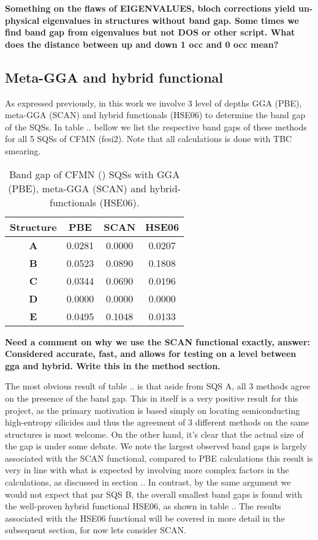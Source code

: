 \textbf{Something on the flaws of EIGENVALUES, bloch corrections yield un-physical eigenvalues in structures without band gap. Some times we find band gap from eigenvalues but not DOS or other script. What does the distance between up and down 1 occ and 0 occ mean?} 

\subsection{Meta-GGA and hybrid functional}

As expressed previously, in this work we involve 3 level of depths GGA (PBE), meta-GGA (SCAN) and hybrid functionals (HSE06) to determine the band gap of the SQSs. In table .. bellow we list the respective band gaps of these methods for all 5 SQSs of CFMN (fesi2). Note that all calculations is done with TBC smearing.

\begin{table}[H]
\centering
\begin{tabular}{@{}cccc@{}}
\toprule
Structure  & PBE    & SCAN   & HSE06  \\ \midrule
\textbf{A} & 0.0281 & 0.0000 & 0.0207 \\
\textbf{B} & 0.0523 & 0.0890 & 0.1808 \\
\textbf{C} & 0.0344 & 0.0690 & 0.0196 \\
\textbf{D} & 0.0000 & 0.0000 & 0.0000 \\
\textbf{E} & 0.0495 & 0.1048 & 0.0133 \\ \bottomrule
\end{tabular}
\caption{Band gap of CFMN () SQSs with GGA (PBE), meta-GGA (SCAN) and hybrid-functionals (HSE06).}
\end{table}

\textbf{Need a comment on why we use the SCAN functional exactly, answer: Considered accurate, fast, and allows for testing on a level between gga and hybrid. Write this in the method section.}

The most obvious result of table .. is that aside from SQS A, all 3 methods agree on the presence of the band gap. This in itself is a very positive result for this project, as the primary motivation is based simply on locating semiconducting high-entropy silicides and thus the agreement of 3 different methods on the same structures is most welcome. On the other hand, it's clear that the actual size of the gap is under some debate. We note the largest observed band gaps is largely associated with the SCAN functional, compared to PBE calculations this result is very in line with what is expected by involving more complex factors in the calculations, as discussed in section .. In contrast, by the same argument we would not expect that par SQS B, the overall smallest band gaps is found with the well-proven hybrid functional HSE06, as shown in table .. The results associated with the HSE06 functional will be covered in more detail in the subsequent section, for now lets consider SCAN. 
 
